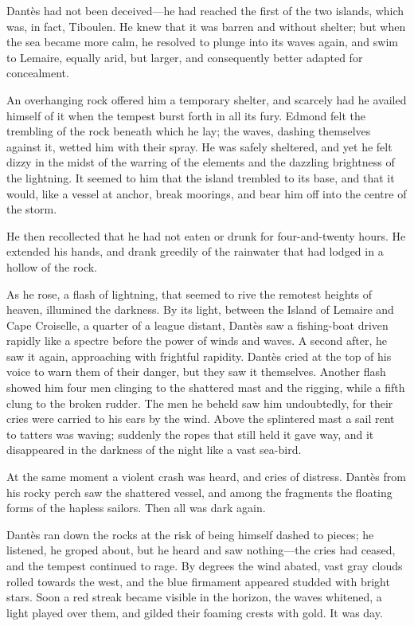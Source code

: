 Dantès had not been deceived—he had reached the first of the two
islands, which was, in fact, Tiboulen. He knew that it was barren and
without shelter; but when the sea became more calm, he resolved to
plunge into its waves again, and swim to Lemaire, equally arid, but
larger, and consequently better adapted for concealment.

An overhanging rock offered him a temporary shelter, and scarcely had
he availed himself of it when the tempest burst forth in all its fury.
Edmond felt the trembling of the rock beneath which he lay; the waves,
dashing themselves against it, wetted him with their spray. He was
safely sheltered, and yet he felt dizzy in the midst of the warring of
the elements and the dazzling brightness of the lightning. It seemed to
him that the island trembled to its base, and that it would, like a
vessel at anchor, break moorings, and bear him off into the centre of
the storm.

He then recollected that he had not eaten or drunk for four-and-twenty
hours. He extended his hands, and drank greedily of the rainwater that
had lodged in a hollow of the rock.

As he rose, a flash of lightning, that seemed to rive the remotest
heights of heaven, illumined the darkness. By its light, between the
Island of Lemaire and Cape Croiselle, a quarter of a league distant,
Dantès saw a fishing-boat driven rapidly like a spectre before the
power of winds and waves. A second after, he saw it again, approaching
with frightful rapidity. Dantès cried at the top of his voice to warn
them of their danger, but they saw it themselves. Another flash showed
him four men clinging to the shattered mast and the rigging, while a
fifth clung to the broken rudder. The men he beheld saw him
undoubtedly, for their cries were carried to his ears by the wind.
Above the splintered mast a sail rent to tatters was waving; suddenly
the ropes that still held it gave way, and it disappeared in the
darkness of the night like a vast sea-bird.

At the same moment a violent crash was heard, and cries of distress.
Dantès from his rocky perch saw the shattered vessel, and among the
fragments the floating forms of the hapless sailors. Then all was dark
again.

Dantès ran down the rocks at the risk of being himself dashed to
pieces; he listened, he groped about, but he heard and saw nothing—the
cries had ceased, and the tempest continued to rage. By degrees the
wind abated, vast gray clouds rolled towards the west, and the blue
firmament appeared studded with bright stars. Soon a red streak became
visible in the horizon, the waves whitened, a light played over them,
and gilded their foaming crests with gold. It was day.

